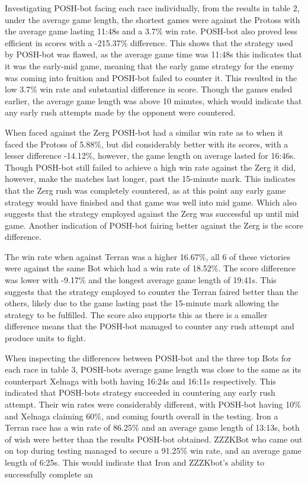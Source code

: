 \documentclass[journal]{IEEEtran}
\begin{document}
	Investigating POSH-bot facing each race individually, from the results in table 2, under the average game length, the shortest games were against the Protoss with the average game lasting 11:48s and a 3.7\% win rate. POSH-bot also proved less efficient in scores with a -215.37\% difference. This shows that the strategy used by POSH-bot was flawed, as the average game time was 11:48s this indicates that it was the early-mid game, meaning that the early game strategy for the enemy was coming into fruition and POSH-bot failed to counter it. This resulted in the low 3.7\% win rate and substantial difference in score. Though the games ended earlier, the average game length was above 10 minutes, which would indicate that any early rush attempts made by the opponent were countered.
	
	When faced against the Zerg POSH-bot had a similar win rate as to when it faced the Protoss of 5.88\%, but did considerably better with its scores, with a lesser difference -14.12\%, however, the game length on average lasted for 16:46s. Though POSH-bot still failed to achieve a high win rate against the Zerg it did, however, make the matches last longer, past the 15-minute mark. This indicates that the Zerg rush was completely countered, as at this point any early game strategy would have finished and that game was well into mid game. Which also suggests that the strategy employed against the Zerg was successful up until mid game. Another indication of POSH-bot fairing better against the Zerg is the score difference.
	
	The win rate when against Terran was a higher 16.67\%, all 6 of these victories were against the same Bot which had a win rate of 18.52\%. The score difference was lower with -9.17\% and the longest average game length of 19:41s. This suggests that the strategy employed to counter the Terran faired better than the others, likely due to the game lasting past the 15-minute mark allowing the strategy to be fulfilled. The score also supports this as there is a smaller difference means that the POSH-bot managed to counter any rush attempt and produce units to fight.
	
	When inspecting the differences between POSH-bot and the three top Bots for each race in table 3, POSH-bots average game length was close to the same as its counterpart Xelnaga with both having 16:24s and 16:11s respectively. This indicated that POSH-bots strategy succeeded in countering any early rush attempt. Their win rates were considerably different, with POSH-bot having 10\% and Xelnaga claiming 60\%, and coming fourth overall in the testing. Iron a Terran race has a win rate of 86.25\% and an average game length of 13:13s, both of wish were better than the results POSH-bot obtained. ZZZKBot who came out on top during testing managed to secure a 91.25\% win rate, and an average game length of 6:25s. This would indicate that Iron and ZZZKbot's ability to successfully complete an 
	
\end{document}
